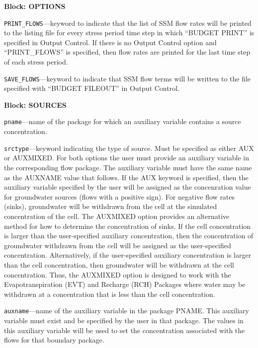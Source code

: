 
\item \textbf{Block: OPTIONS}

\begin{description}
\item \texttt{PRINT\_FLOWS}---keyword to indicate that the list of SSM flow rates will be printed to the listing file for every stress period time step in which ``BUDGET PRINT'' is specified in Output Control.  If there is no Output Control option and ``PRINT\_FLOWS'' is specified, then flow rates are printed for the last time step of each stress period.

\item \texttt{SAVE\_FLOWS}---keyword to indicate that SSM flow terms will be written to the file specified with ``BUDGET FILEOUT'' in Output Control.

\end{description}
\item \textbf{Block: SOURCES}

\begin{description}
\item \texttt{pname}---name of the package for which an auxiliary variable contains a source concentration.

\item \texttt{srctype}---keyword indicating the type of source.  Must be specified as either AUX or AUXMIXED.  For both options the user must provide an auxiliary variable in the corresponding flow package.  The auxiliary variable must have the same name as the AUXNAME value that follows.  If the AUX keyword is specified, then the auxiliary variable specified by the user will be assigned as the concenration value for groundwater sources (flows with a positive sign).  For negative flow rates (sinks), groundwater will be withdrawn from the cell at the simulated concentration of the cell.  The AUXMIXED option provides an alternative method for how to determine the concentration of sinks.  If the cell concentration is larger than the user-specified auxiliary concentration, then the concentration of groundwater withdrawn from the cell will be assigned as the user-specified concentration.  Alternatively, if the user-specified auxiliary concentration is larger than the cell concentration, then groundwater will be withdrawn at the cell concentration.  Thus, the AUXMIXED option is designed to work with the Evapotranspiration (EVT) and Recharge (RCH) Packages where water may be withdrawn at a concentration that is less than the cell concentration.

\item \texttt{auxname}---name of the auxiliary variable in the package PNAME.  This auxiliary variable must exist and be specified by the user in that package.  The values in this auxiliary variable will be used to set the concentration associated with the flows for that boundary package.

\end{description}

